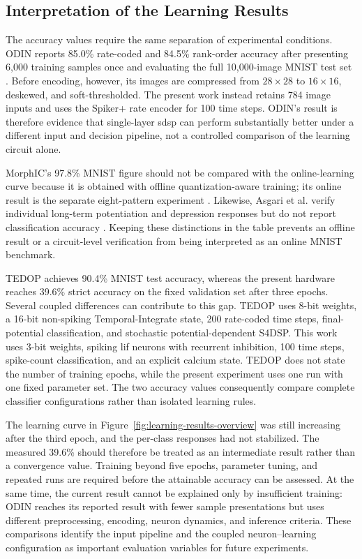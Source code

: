 \subsection{Interpretation of the Learning Results}

The accuracy values require the same separation of experimental conditions. ODIN reports 85.0\% rate-coded and 84.5\% rank-order accuracy after presenting 6,000 training samples once and evaluating the full 10,000-image MNIST test set \cite{Frenkel2019ODIN}. Before encoding, however, its images are compressed from $28\times28$ to $16\times16$, deskewed, and soft-thresholded. The present work instead retains 784 image inputs and uses the Spiker+ rate encoder for 100 time steps. ODIN's result is therefore evidence that single-layer \gls{sdsp} can perform substantially better under a different input and decision pipeline, not a controlled comparison of the learning circuit alone.

MorphIC's 97.8\% MNIST figure should not be compared with the online-learning curve because it is obtained with offline quantization-aware training; its online result is the separate eight-pattern experiment \cite{Frenkel2019MorphIC}. Likewise, Asgari et al. verify individual long-term potentiation and depression responses but do not report classification accuracy \cite{Asgari2020SDSP}. Keeping these distinctions in the table prevents an offline result or a circuit-level verification from being interpreted as an online MNIST benchmark.

TEDOP achieves 90.4\% MNIST test accuracy, whereas the present hardware reaches 39.6\% strict accuracy on the fixed validation set after three epochs. Several coupled differences can contribute to this gap. TEDOP uses 8-bit weights, a 16-bit non-spiking Temporal-Integrate state, 200 rate-coded time steps, final-potential classification, and stochastic potential-dependent S4DSP. This work uses 3-bit weights, spiking \gls{lif} neurons with recurrent inhibition, 100 time steps, spike-count classification, and an explicit calcium state. TEDOP does not state the number of training epochs, while the present experiment uses one run with one fixed parameter set. The two accuracy values consequently compare complete classifier configurations rather than isolated learning rules.

The learning curve in Figure~\ref{fig:learning-results-overview} was still increasing after the third epoch, and the per-class responses had not stabilized. The measured 39.6\% should therefore be treated as an intermediate result rather than a convergence value. Training beyond five epochs, parameter tuning, and repeated runs are required before the attainable accuracy can be assessed. At the same time, the current result cannot be explained only by insufficient training: ODIN reaches its reported result with fewer sample presentations but uses different preprocessing, encoding, neuron dynamics, and inference criteria. These comparisons identify the input pipeline and the coupled neuron--learning configuration as important evaluation variables for future experiments.

